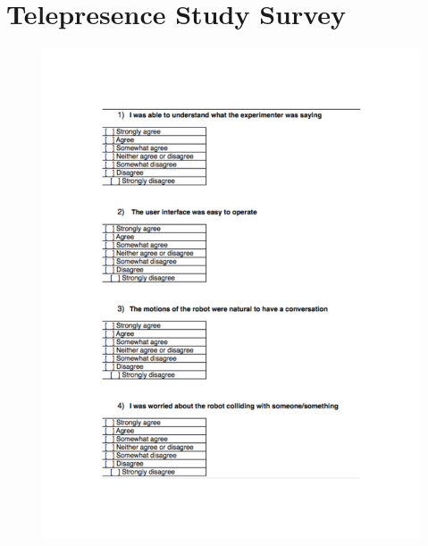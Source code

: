 \documentclass[12pt]{gatech-thesis}
\begin{document}



\appendix

%
%
%
\chapter{Telepresence Study Survey}
\label{chapter:telepresence_user_study_survey_questions}

\begin{figure}[ht!]
\includegraphics[width=1.0\textwidth]{pics/telepresence_survey_0}
\end{figure}
\end{document}
